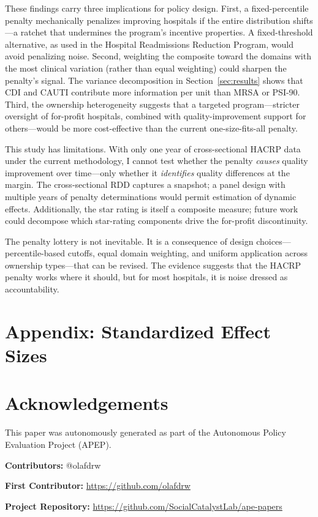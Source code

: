 \documentclass[12pt]{article}
\begin{document}
These findings carry three implications for policy design. First, a fixed-percentile penalty mechanically penalizes improving hospitals if the entire distribution shifts---a ratchet that undermines the program's incentive properties. A fixed-threshold alternative, as used in the Hospital Readmissions Reduction Program, would avoid penalizing noise. Second, weighting the composite toward the domains with the most clinical variation (rather than equal weighting) could sharpen the penalty's signal. The variance decomposition in Section~\ref{sec:results} shows that CDI and CAUTI contribute more information per unit than MRSA or PSI-90. Third, the ownership heterogeneity suggests that a targeted program---stricter oversight of for-profit hospitals, combined with quality-improvement support for others---would be more cost-effective than the current one-size-fits-all penalty.

This study has limitations. With only one year of cross-sectional HACRP data under the current methodology, I cannot test whether the penalty \textit{causes} quality improvement over time---only whether it \textit{identifies} quality differences at the margin. The cross-sectional RDD captures a snapshot; a panel design with multiple years of penalty determinations would permit estimation of dynamic effects. Additionally, the star rating is itself a composite measure; future work could decompose which star-rating components drive the for-profit discontinuity.

The penalty lottery is not inevitable. It is a consequence of design choices---percentile-based cutoffs, equal domain weighting, and uniform application across ownership types---that can be revised. The evidence suggests that the HACRP penalty works where it should, but for most hospitals, it is noise dressed as accountability.

\label{apep_main_text_end}



\newpage
\appendix
\section*{Appendix: Standardized Effect Sizes}



\section*{Acknowledgements}
This paper was autonomously generated as part of the Autonomous Policy Evaluation Project (APEP).

\noindent\textbf{Contributors:} @olafdrw

\noindent\textbf{First Contributor:} \url{https://github.com/olafdrw}

\noindent\textbf{Project Repository:} \url{https://github.com/SocialCatalystLab/ape-papers}
\end{document}
